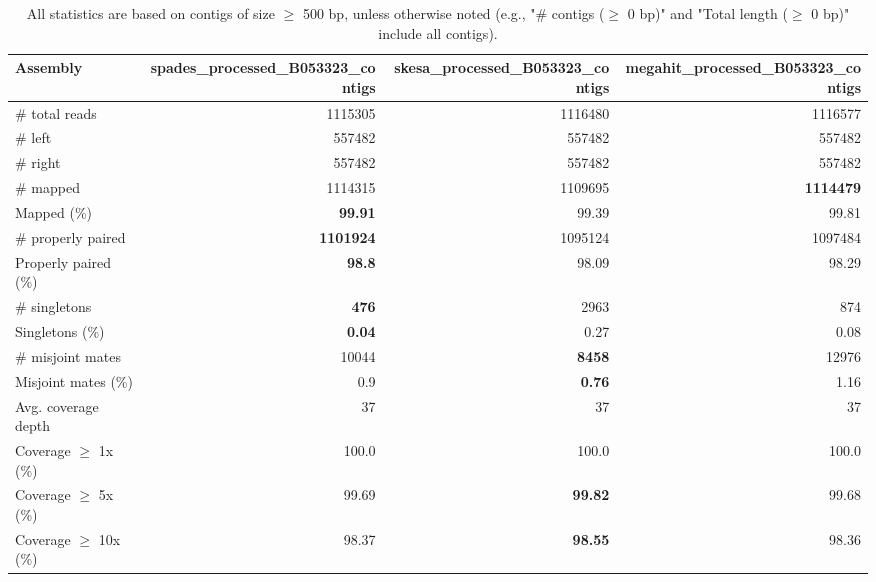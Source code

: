 \documentclass[12pt,a4paper]{article}
\begin{document}
\begin{table}[ht]
\begin{center}
\caption{All statistics are based on contigs of size $\geq$ 500 bp, unless otherwise noted (e.g., "\# contigs ($\geq$ 0 bp)" and "Total length ($\geq$ 0 bp)" include all contigs).}
\begin{tabular}{|l*{3}{|r}|}
\hline
Assembly & spades\_processed\_B053323\_contigs & skesa\_processed\_B053323\_contigs & megahit\_processed\_B053323\_contigs \\ \hline
\# total reads & 1115305 & 1116480 & 1116577 \\ \hline
\# left & 557482 & 557482 & 557482 \\ \hline
\# right & 557482 & 557482 & 557482 \\ \hline
\# mapped & 1114315 & 1109695 & {\bf 1114479} \\ \hline
Mapped (\%) & {\bf 99.91} & 99.39 & 99.81 \\ \hline
\# properly paired & {\bf 1101924} & 1095124 & 1097484 \\ \hline
Properly paired (\%) & {\bf 98.8} & 98.09 & 98.29 \\ \hline
\# singletons & {\bf 476} & 2963 & 874 \\ \hline
Singletons (\%) & {\bf 0.04} & 0.27 & 0.08 \\ \hline
\# misjoint mates & 10044 & {\bf 8458} & 12976 \\ \hline
Misjoint mates (\%) & 0.9 & {\bf 0.76} & 1.16 \\ \hline
Avg. coverage depth & 37 & 37 & 37 \\ \hline
Coverage $\geq$ 1x (\%) & 100.0 & 100.0 & 100.0 \\ \hline
Coverage $\geq$ 5x (\%) & 99.69 & {\bf 99.82} & 99.68 \\ \hline
Coverage $\geq$ 10x (\%) & 98.37 & {\bf 98.55} & 98.36 \\ \hline
\end{tabular}
\end{center}
\end{table}
\end{document}
